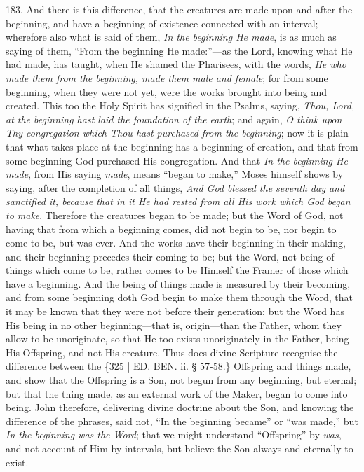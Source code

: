 183. And there is this
difference, that the creatures are made upon and after the
beginning, and have a beginning of existence connected with an
interval; wherefore also what is said of them, \emph{In the beginning He
made}, is as much as saying of them, ``From the beginning He made:''—as
the Lord, knowing what He had made, has taught, when He shamed the
Pharisees, with the words, \emph{He who made them from the beginning,
made them male and female}; for from some beginning, when they were
not yet, were the works brought into being and created. This too the
Holy Spirit has signified in the Psalms, saying, \emph{Thou, Lord, at the
beginning hast laid the foundation of the earth}; and again, \emph{O
think upon Thy congregation which Thou hast purchased from the
beginning}; now it is plain that what takes place at the beginning
has a beginning of creation, and that from some beginning God
purchased His congregation. And that \emph{In the beginning He made},
from His saying \emph{made}, means ``began to make,'' Moses himself
shows by saying, after the completion of all things, \emph{And God
blessed the seventh day and sanctified it, because that in it He had
rested from all His work which God began to make}. Therefore the
creatures began to be made; but the Word of God, not having that from
which a beginning comes, did not begin to be, nor begin to come to be,
but was ever. And the works have their beginning in their making, and
their beginning precedes their coming to be; but the Word, not being
of things which come to be, rather comes to be Himself the Framer of
those which have a beginning. And the being of things made is measured
by their becoming, and from some beginning doth God begin to make them
through the Word, that it may be known that they were not before their
generation; but the Word has His being in no other beginning—that
is, origin—than the Father, whom they allow to be unoriginate, so
that He too exists unoriginately in the Father, being His Offspring,
and not His creature. Thus does divine Scripture recognise the
difference between the \{325 | ED. BEN.
ii. § 57-58.\} Offspring and things made, and show that the Offspring
is a Son, not begun from any beginning, but eternal; but that the
thing made, as an external work of the Maker, began to come into
being. John therefore, delivering divine doctrine about the Son, and
knowing the difference of the phrases, said not, ``In the beginning
became'' or ``was made,'' but \emph{In the beginning was the Word}; that
we might understand ``Offspring'' by \emph{was}, and not account of Him
by intervals, but believe the Son always and eternally to exist.

